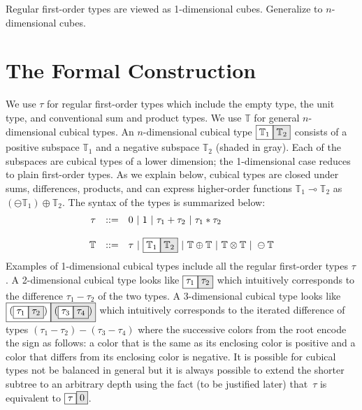 \documentclass[authoryear,preprint]{sigplanconf}
\newcommand{\lolli}{\multimap}
\newcommand{\cubt}{\mathbb{T}}
\newcommand{\nodet}[2]{\fcolorbox{black}{white}{$#1$}\fcolorbox{black}{gray!20}{$#2$}}
\begin{document}
Regular first-order types are viewed as 1-dimensional cubes. Generalize to
$n$-dimensional cubes. 

\section{The Formal Construction} 

We use $\tau$ for regular first-order types which include the empty type, the
unit type, and conventional sum and product types.  We use $\cubt$ for
general $n$-dimensional cubical types. An $n$-dimensional cubical type
$\nodet{\cubt_1}{\cubt_2}$ consists of a positive subspace $\cubt_1$ and a
negative subspace $\cubt_2$ (shaded in gray). Each of the subspaces are
cubical types of a lower dimension; the 1-dimensional case reduces to plain
first-order types. As we explain below, cubical types are closed under sums,
differences, products, and can express higher-order functions $\cubt_1 \lolli
\cubt_2$ as $(\ominus \cubt_1) \oplus \cubt_2$. The syntax of the types is
summarized below:
\[\begin{array}{rcl}
\tau &::=& 0 \alt 1 \alt \tau_1 + \tau_2 \alt \tau_1 * \tau_2 \\
\\
\cubt &::=& \tau \alt \nodet{\cubt_1}{\cubt_2} 
      \alt \cubt \oplus \cubt 
      \alt \cubt \otimes \cubt 
      \alt \ominus \cubt 
\end{array}\]
Examples of 1-dimensional cubical types include all the regular first-order
types $\tau$. A 2-dimensional cubical type looks like
$\nodet{\tau_1}{\tau_2}$ which intuitively corresponds to the difference
$\tau_1 - \tau_2$ of the two types. A 3-dimensional cubical type looks like
$\nodet{(\nodet{\tau_1}{\tau_2})}{(\nodet{\tau_3}{\tau_4})}$ which
intuitively corresponds to the iterated difference of types
$(\tau_1-\tau_2)-(\tau_3-\tau_4)$ where the successive colors from the root
encode the sign as follows: a color that is the same as its enclosing color
is positive and a color that differs from its enclosing color is negative. It
is possible for cubical types not be balanced in general but it is always
possible to extend the shorter subtree to an arbitrary depth using the fact
(to be justified later) that~$\tau$ is equivalent to $\nodet{\tau}{0}$.
\end{document}
